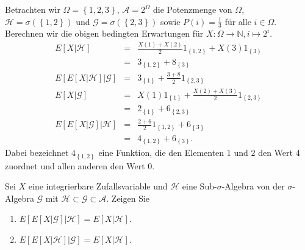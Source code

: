 \solution 
Betrachten wir $\Omega=\left\{ 1,2,3 \right\}$, $\mathcal A=2^\Omega$ die Potenzmenge von $\Omega$,
$\mathcal H=\sigma\left( \left\{ 1,2 \right\} \right)$ und 
$\mathcal G=\sigma\left( \left\{ 2,3 \right\} \right)$ sowie 
$P\left( i \right)=\frac{1}{3}$ für alle $i\in\Omega$. Berechnen wir die obigen bedingten
Erwartungen für $X:\Omega\to\mathbb N, i\mapsto 2^i$.
\begin{eqnarray*}
	E\left[ X|\mathcal H \right] &=&
	\frac{X\left( 1 \right)+X\left( 2 \right)}{2}1_{\left\{ 1,2 \right\}} + X\left( 3 \right) 1_{ \left\{ 3 \right\} } \\
	&=& 3_{  \left\{ 1,2 \right\} } + 8_{ \left\{ 3 \right\}  } \\ 
	E\left[ E\left[ X|\mathcal H \right]|\mathcal G \right] 
	&=& 3_{ \left\{ 1 \right\} } + \frac{3+8}{2} 1_{ \left\{ 2,3 \right\} } \\
	E\left[ X|\mathcal G \right] &=& 
	X\left( 1 \right) 1_{ \left\{ 1 \right\} } + \frac{X\left( 2 \right)+X\left( 3 \right)}{2}1_{ \left\{ 2,3 \right\} } \\
	&=& 2_{ \left\{ 1 \right\} } + 6_{ \left\{ 2,3 \right\} } \\
	E\left[ E\left[ X|\mathcal G \right]| \mathcal H \right] 
	&=& \frac{2+6}{2}1_{ \left\{ 1,2 \right\} } + 6_{ \left\{ 3 \right\} } \\
	&=& 4_{ \left\{ 1,2 \right\} } + 6_{ \left\{ 3 \right\} }.
\end{eqnarray*}
Dabei bezeichnet $4_{ \left\{ 1,2 \right\} }$ eine Funktion, die den Elementen $1$ und $2$
den Wert $4$ zuordnet und allen anderen den Wert $0$.


 Sei $X$ eine integrierbare
Zufallsvariable und $\mathcal H$ eine Sub-$\sigma$-Algebra von der
$\sigma$-Algebra $\mathcal G$ mit $\mathcal H \subset \mathcal G \subset
\mathcal A$. Zeigen Sie
\begin{enumerate}
    \item $E\left[ E\left[ X | \mathcal G \right] | \mathcal H \right] =
        E \left[ X | \mathcal H \right]$.
    \item $E\left[ E\left[ X | \mathcal H \right] | \mathcal G \right] =
        E \left[ X | \mathcal H \right]$.
\end{enumerate}

